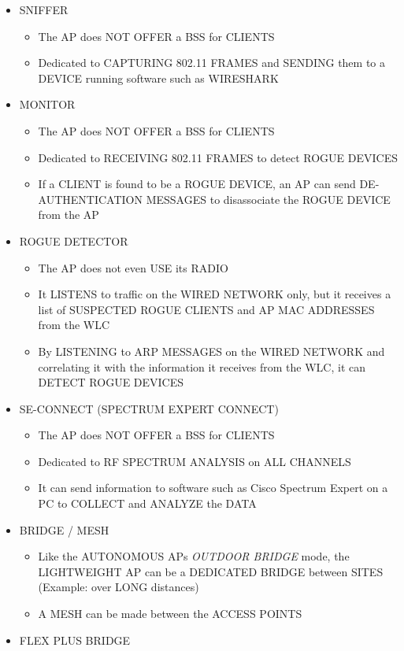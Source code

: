 \begin{itemize}
\tightlist
\item
  SNIFFER

  \begin{itemize}
  \tightlist
  \item
    The AP does NOT OFFER a BSS for CLIENTS
  \item
    Dedicated to CAPTURING 802.11 FRAMES and SENDING them to a DEVICE
    running software such as WIRESHARK
  \end{itemize}
\item
  MONITOR

  \begin{itemize}
  \tightlist
  \item
    The AP does NOT OFFER a BSS for CLIENTS
  \item
    Dedicated to RECEIVING 802.11 FRAMES to detect ROGUE DEVICES
  \item
    If a CLIENT is found to be a ROGUE DEVICE, an AP can send
    DE-AUTHENTICATION MESSAGES to disassociate the ROGUE DEVICE from the
    AP
  \end{itemize}
\item
  ROGUE DETECTOR

  \begin{itemize}
  \tightlist
  \item
    The AP does not even USE its RADIO
  \item
    It LISTENS to traffic on the WIRED NETWORK only, but it receives a
    list of SUSPECTED ROGUE CLIENTS and AP MAC ADDRESSES from the WLC
  \item
    By LISTENING to ARP MESSAGES on the WIRED NETWORK and correlating it
    with the information it receives from the WLC, it can DETECT ROGUE
    DEVICES
  \end{itemize}
\item
  SE-CONNECT (SPECTRUM EXPERT CONNECT)

  \begin{itemize}
  \tightlist
  \item
    The AP does NOT OFFER a BSS for CLIENTS
  \item
    Dedicated to RF SPECTRUM ANALYSIS on ALL CHANNELS
  \item
    It can send information to software such as Cisco Spectrum Expert on
    a PC to COLLECT and ANALYZE the DATA
  \end{itemize}
\item
  BRIDGE / MESH

  \begin{itemize}
  \tightlist
  \item
    Like the AUTONOMOUS APs \emph{OUTDOOR BRIDGE} mode, the LIGHTWEIGHT
    AP can be a DEDICATED BRIDGE between SITES (Example: over LONG
    distances)
  \item
    A MESH can be made between the ACCESS POINTS
  \end{itemize}
\item
  FLEX PLUS BRIDGE


\end{itemize}
